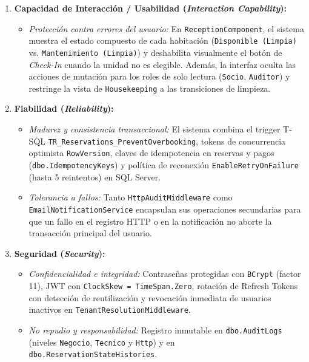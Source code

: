 \documentclass[12pt,a4paper]{article}
\begin{document}
\begin{enumerate}
    \item \textbf{Capacidad de Interacci\'on / Usabilidad (\textit{Interaction Capability}):}
    \begin{itemize}
        \item \textit{Protecci\'on contra errores del usuario:} En \texttt{ReceptionComponent}, el sistema muestra el estado compuesto de cada habitaci\'on (\texttt{Disponible (Limpia)} vs. \texttt{Mantenimiento (Limpia)}) y deshabilita visualmente el bot\'on de \textit{Check-In} cuando la unidad no es elegible. Adem\'as, la interfaz oculta las acciones de mutaci\'on para los roles de solo lectura (\texttt{Socio}, \texttt{Auditor}) y restringe la vista de \texttt{Housekeeping} a las transiciones de limpieza.
    \end{itemize}

    \item \textbf{Fiabilidad (\textit{Reliability}):}
    \begin{itemize}
        \item \textit{Madurez y consistencia transaccional:} El sistema combina el trigger T-SQL \texttt{TR\_Reservations\_PreventOverbooking}, tokens de concurrencia optimista \texttt{RowVersion}, claves de idempotencia en reservas y pagos (\texttt{dbo.IdempotencyKeys}) y pol\'itica de reconexi\'on \texttt{EnableRetryOnFailure} (hasta 5 reintentos) en SQL Server.
        \item \textit{Tolerancia a fallos:} Tanto \texttt{HttpAuditMiddleware} como \texttt{EmailNotificationService} encapsulan sus operaciones secundarias para que un fallo en el registro HTTP o en la notificaci\'on no aborte la transacci\'on principal del usuario.
    \end{itemize}

    \item \textbf{Seguridad (\textit{Security}):}
    \begin{itemize}
        \item \textit{Confidencialidad e integridad:} Contrase\~nas protegidas con \texttt{BCrypt} (factor 11), JWT con \texttt{ClockSkew = TimeSpan.Zero}, rotaci\'on de Refresh Tokens con detecci\'on de reutilizaci\'on y revocaci\'on inmediata de usuarios inactivos en \texttt{TenantResolutionMiddleware}.
        \item \textit{No repudio y responsabilidad:} Registro inmutable en \texttt{dbo.AuditLogs} (niveles \texttt{Negocio}, \texttt{Tecnico} y \texttt{Http}) y en \texttt{dbo.ReservationStateHistories}.
    \end{itemize}


\end{enumerate}
\end{document}
